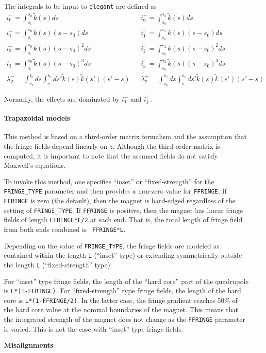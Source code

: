 The integrals to be input to {\tt elegant} are defined as 
\begin{eqnarray}
i_0^- = \int_{s_1}^{s_0} \tilde{k}(s) ds & & i_0^+ = \int_{s_0}^{s_2} \tilde{k}(s) ds \\
i_1^- = \int_{s_1}^{s_0} \tilde{k}(s) (s-s_0) ds & & i_1^+ = \int_{s_0}^{s_2} \tilde{k}(s) (s-s_0) ds \\
i_2^- = \int_{s_1}^{s_0} \tilde{k}(s) (s-s_0)^2 ds & & i_2^+ = \int_{s_0}^{s_2} \tilde{k}(s) (s-s_0)^2 ds \\
i_3^- = \int_{s_1}^{s_0} \tilde{k}(s) (s-s_0)^3 ds & & i_3^+ = \int_{s_0}^{s_2} \tilde{k}(s) (s-s_0)^3 ds \\
\lambda_2^- = \int_{s_1}^{s_0} ds \int_s^{s_0} ds\prime \tilde{k}(s) \tilde{k}(s\prime) (s\prime-s) & & 
\lambda_2^+ = \int_{s_0}^{s_2} ds \int_s^{s_2} ds\prime \tilde{k}(s) \tilde{k}(s\prime) (s\prime-s) 
\end{eqnarray}

Normally, the effects are dominated by $i_1^-$ and $i_1^+$.

\paragraph{Trapazoidal models}
This method is based on a third-order matrix formalism and the assumption that the 
fringe fields depend linearly on $z$.  Although the third-order matrix is computed, it is important
to note that the assumed fields do not satisfy Maxwell's equations.

To invoke this method, one specifies ``inset'' or
``fixed-strength'' for the \verb|FRINGE_TYPE| parameter and then provides
a non-zero value for {\tt FFRINGE}. If  {\tt FFRINGE} is zero (the default), then the magnet
is hard-edged regardless of the setting of \verb|FRINGE_TYPE|.  If {\tt FFRINGE} is positive, then the magnet has
linear fringe fields of length {\tt FFRINGE*L/2} at each end.  That
is, the total length of fringe field from both ends combined is {\tt
FFRINGE*L}.

Depending on the value of {\tt FRINGE\_TYPE}, the fringe fields are
modeled as contained within the length {\tt L} (``inset'' type) or
extending symmetrically outside the length {\tt L} (``fixed-strength''
type).

For ``inset'' type fringe fields, the length of the ``hard core'' part of
the quadrupole is {\tt L*(1-FFRINGE)}.  For ``fixed-strength'' type fringe fields,
the length of the hard core is {\tt L*(1-FFRINGE/2)}.  In the latter case,
the fringe gradient reaches 50\% of the hard core value at the nominal boundaries
of the magnet. This means that the integrated strength of the magnet does not
change as the {\tt FFRINGE} parameter is varied. This is not the case with
``inset'' type fringe fields.


{\bf Misalignments}


